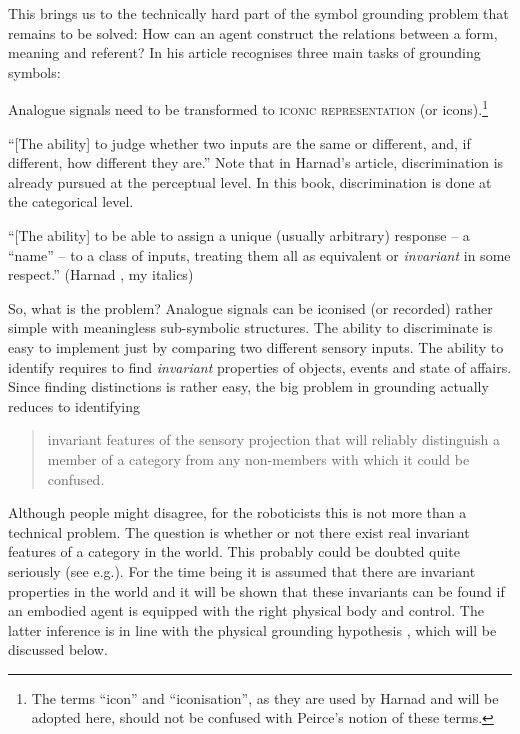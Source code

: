 

This brings us to the technically hard part of the symbol grounding problem that remains to be solved: How can an agent construct the relations between a form, meaning and referent? In his article \citet{harnad:1990} recognises three main tasks of grounding symbols:

\begin{description}
\item[Iconisation]Analogue signals need to be transformed to {\scshape iconic representation} (or icons).\footnote{The terms ``icon'' and ``iconisation'', as they are used by Harnad and will be adopted here, should not be confused with Peirce's notion of these terms.} 
\item[Discrimination] ``[The ability] to judge whether two inputs are the same or different, and, if different, how different they are.'' Note that in Harnad's article, discrimination is already pursued at the perceptual level. In this book, discrimination is done at the categorical level.
\item[Identification] ``[The ability] to be able to assign a unique (usually arbitrary) response -- a ``name'' -- to a class of inputs, treating them all as equivalent or {\em invariant} in some respect.'' (Harnad \citeyear{harnad:1990}, my italics)
\end{description}


So, what is the problem? Analogue signals can be iconised (or recorded) rather simple with meaningless sub-symbolic structures. The ability to discriminate is easy to implement just by comparing two different sensory inputs. The ability to identify requires to find {\em invariant} properties of objects, events and state of affairs. Since finding distinctions is rather easy, the big problem in grounding actually reduces to identifying

\begin{quote}
invariant features of the sensory projection that will reliably distinguish a member of  a category from any non-members with which it could be confused. \citep{harnad:1990}
\end{quote}

Although people might disagree, for the roboticists this is not more than a technical problem. The question is whether or not there exist real invariant features of a category in the world. This probably could be doubted quite seriously (see e.g.\citealt{harnad:1993}). For the time being it is assumed that there are invariant properties in the world and it will be shown that these invariants can be found if an embodied agent is equipped with the right physical body and control. The latter inference is in line with the {\sc physical grounding hypothesis} \citep{brooks:1990}, which will be discussed below.


